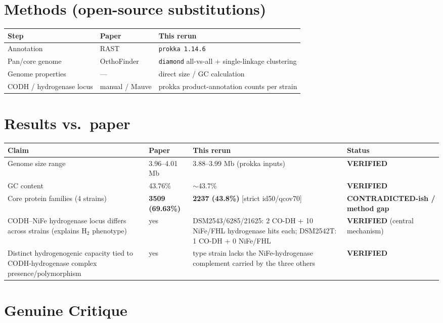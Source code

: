 \documentclass[11pt]{article}
\begin{document}
\section{Methods (open-source substitutions)}
\begin{center}
\begin{tabular}{lll}
\toprule
Step & Paper & This rerun \\
\midrule
Annotation & RAST & \texttt{prokka 1.14.6} \\
Pan/core genome & OrthoFinder & \texttt{diamond} all-vs-all + single-linkage clustering \\
Genome properties & --- & direct size / GC calculation \\
CODH / hydrogenase locus & manual / Mauve & prokka product-annotation counts per strain \\
\bottomrule
\end{tabular}
\end{center}

\section{Results vs.\ paper}
\begin{center}
\small
\begin{tabular}{p{5.5cm} p{3.2cm} p{4.5cm} p{2.2cm}}
\toprule
Claim & Paper & This rerun & Status \\
\midrule
Genome size range & 3.96--4.01 Mb & 3.88--3.99 Mb (prokka inputs) & \textbf{VERIFIED} \\
GC content & 43.76\% & $\sim$43.7\% & \textbf{VERIFIED} \\
Core protein families (4 strains) & \textbf{3509 (69.63\%)} & \textbf{2237 (43.8\%)} [strict id50/qcov70] & \textbf{CONTRADICTED-ish / method gap} \\
CODH--NiFe hydrogenase locus differs across strains (explains H$_2$ phenotype) & yes &
DSM2543/6285/21625: 2 CO-DH + 10 NiFe/FHL hydrogenase hits each; DSM2542T: 1 CO-DH + 0 NiFe/FHL & \textbf{VERIFIED} (central mechanism) \\
Distinct hydrogenogenic capacity tied to CODH-hydrogenase complex presence/polymorphism & yes &
type strain lacks the NiFe-hydrogenase complement carried by the three others & \textbf{VERIFIED} \\
\bottomrule
\end{tabular}
\end{center}

\section{Genuine Critique}
\end{document}
